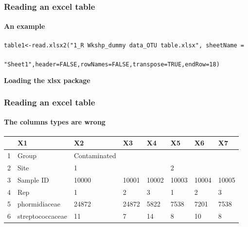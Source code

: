 \documentclass[12pt]{beamer}\usepackage[]{graphicx}\usepackage[]{color}
\makeatletter
\newenvironment{kframe}{%
 \def\at@end@of@kframe{}%
 \ifinner\ifhmode%
  \def\at@end@of@kframe{\end{minipage}}%
  \begin{minipage}{\columnwidth}%
 \fi\fi%
 \def\FrameCommand##1{\hskip\@totalleftmargin \hskip-\fboxsep
 \colorbox{shadecolor}{##1}\hskip-\fboxsep
     \hskip-\linewidth \hskip-\@totalleftmargin \hskip\columnwidth}%
 \MakeFramed {\advance\hsize-\width
   \@totalleftmargin\z@ \linewidth\hsize
   \@setminipage}}%
 {\par\unskip\endMakeFramed%
 \at@end@of@kframe}
\newenvironment{knitrout}{}{} %
\makeatother
\begin{document}
\begin{frame}[fragile]
  \frametitle{Reading an excel table}
  \framesubtitle{An example}
\begin{lstlisting} 
table1<-read.xlsx2("1_R Wkshp_dummy data_OTU table.xlsx", sheetName = 

"Sheet1",header=FALSE,rowNames=FALSE,transpose=TRUE,endRow=18)
\end{lstlisting}
{\bf Loading the xlsx package}  
\begin{knitrout}
\color{fgcolor}\begin{kframe}


{\ttfamily\noindent\itshape\color{messagecolor}{\#\# Loading required package: xlsx}}

{\ttfamily\noindent\color{warningcolor}{\#\# Warning: package 'xlsx' was built under R version 3.1.3}}

{\ttfamily\noindent\itshape\color{messagecolor}{\#\# Loading required package: rJava}}

{\ttfamily\noindent\color{warningcolor}{\#\# Warning: package 'rJava' was built under R version 3.1.3}}

{\ttfamily\noindent\itshape\color{messagecolor}{\#\# Loading required package: methods\\\#\# Loading required package: xlsxjars\\\#\# Loading required package: xtable}}\end{kframe}
\end{knitrout}
\end{frame}
\begin{frame}[fragile]
  \frametitle{Reading an excel table}
  \framesubtitle{The columns types are wrong}
\begin{table}[ht]
\centering
\begin{tabular}{rlllllll}
  \hline
 & X1 & X2 & X3 & X4 & X5 & X6 & X7 \\ 
  \hline
1 & Group & Contaminated &  &  &  &  &  \\ 
  2 & Site & 1 &  &  & 2 &  &  \\ 
  3 & Sample ID & 10000 & 10001 & 10002 & 10003 & 10004 & 10005 \\ 
  4 & Rep & 1 & 2 & 3 & 1 & 2 & 3 \\ 
  5 & phormidiaceae & 24872 & 24872 & 5822 & 7538 & 7201 & 7538 \\ 
  6 & streptococcaceae & 11 & 7 & 14 & 8 & 10 & 8 \\ 
   \hline
\end{tabular}
\end{table}

\clearpage
\end{frame}
\end{document}
